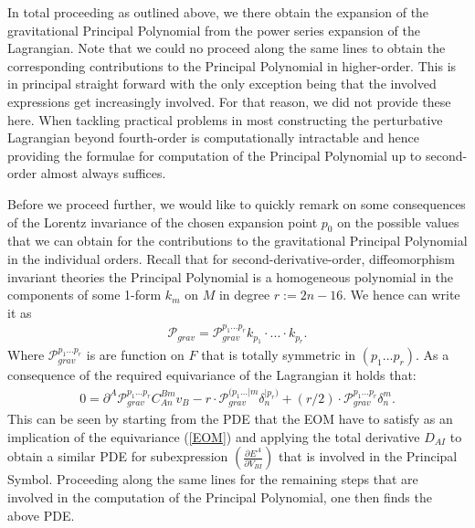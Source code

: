 In total proceeding as outlined above, we there obtain the expansion of the gravitational Principal Polynomial from the power series expansion of the Lagrangian.
Note that we could no proceed along the same lines to obtain the corresponding contributions to the Principal Polynomial in higher-order. This is in principal straight forward with the only exception being that the involved expressions get increasingly involved. For that reason, we did not provide these here. When tackling practical problems in most constructing the perturbative Lagrangian beyond fourth-order is computationally intractable and hence providing the formulae for computation of the Principal Polynomial up to second-order almost always suffices.

Before we proceed further, we would like to quickly remark on some consequences of the Lorentz invariance of the chosen expansion point $p_0$ on the possible values that we can obtain for the contributions to the gravitational Principal Polynomial in the individual orders. Recall that for second-derivative-order, diffeomorphism invariant theories the Principal Polynomial is a homogeneous polynomial in the components of some 1-form $k_m$ on $M$ in degree $r := 2n-16$. We hence can write it as 
\begin{align}
    \mathcal{P}_{grav} = \mathcal{P}_{grav}^{{p_1}...{p_{r}}} k_{p_1} \cdot ... \cdot k_{p_r}.
\end{align}
Where $\mathcal{P}_{grav}^{{p_1}...{p_r}}$ is are function on $F$ that is totally symmetric in $(p_1...p_r)$. As a consequence of the required equivariance of the Lagrangian it holds that:
\begin{align}\label{polyEqn}
    0 = \partial^A\mathcal{P}_{grav}^{{p_1}...{p_r}}C_{An}^{Bm}v_B - r \cdot \mathcal{P}_{grav}^{({p_1}...\vert m} \delta_{n}^{\vert p_r) }  + (r/2) \cdot \mathcal{P}_{grav}^{{p_1}...{p_r}} \delta^m_n.
\end{align}
%
%
%
This can be seen by starting from the PDE that the EOM have to satisfy as an implication of the equivariance (\ref{EOM}) and applying the total derivative $D_{AI}$ to obtain a similar PDE for subexpression $\left ( \frac{\partial E^A}{\partial V_{BI}} \right )$ that is involved in the Principal Symbol. Proceeding along the same lines for the remaining steps that are involved in the computation of the Principal Polynomial, one then finds the above PDE. 

